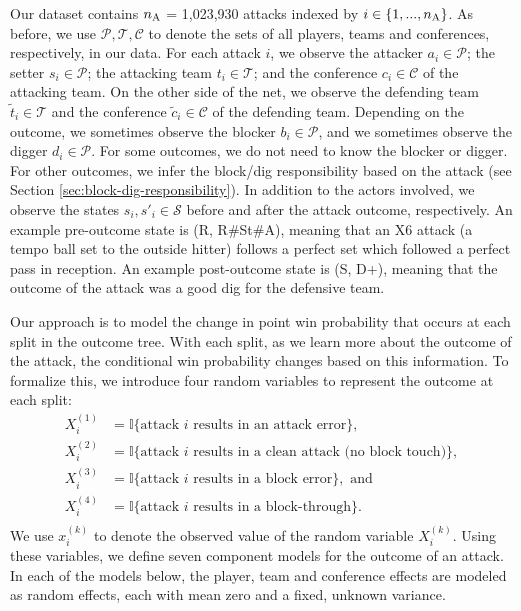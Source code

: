 \documentclass[USenglish]{article}
\theoremstyle{dgthm}
\theoremstyle{dgdef}
\begin{document}
Our dataset contains $n_{\mbox{\scriptsize A}}$ = 1,023,930 attacks indexed by $i \in \{1, ..., n_{\mbox{\scriptsize A}}\}$. As before, we use $\mathcal{P}, \mathcal{T}, \mathcal{C}$ to denote the sets of all players, teams and conferences, respectively, in our data. For each attack $i$, we observe the attacker $a_i \in \mathcal{P}$; the setter $s_i \in \mathcal{P}$; the attacking team $t_i \in \mathcal{T}$; and the conference $c_i \in \mathcal{C}$ of the attacking team. On the other side of the net, we observe the defending team $\tilde t_i \in \mathcal{T}$ and the conference $\tilde c_i \in \mathcal C$ of the defending team. Depending on the outcome, we sometimes observe the blocker $b_i \in \mathcal{P}$, and we sometimes observe the digger $d_i \in \mathcal{P}$. For some outcomes, we do not need to know the blocker or digger. For other outcomes, we infer the block/dig responsibility based on the attack (see Section \ref{sec:block-dig-responsibility}). In addition to the actors involved, we observe the states $s_i, s'_i \in \mathcal{S}$ before and after the attack outcome, respectively. An example pre-outcome state is (R, R\#St\#A), meaning that an X6 attack (a tempo ball set to the outside hitter) follows a perfect set which followed a perfect pass in reception. An example post-outcome state is (S, D+), meaning that the outcome of the attack was a good dig for the defensive team.

Our approach is to model the change in point win probability that occurs at each split in the outcome tree. With each split, as we learn more about the outcome of the attack, the conditional win probability changes based on this information. To formalize this, we introduce four random variables to represent the outcome at each split:
\begin{align*}
    X_i^{(1)} &= \mathbb{I}\{\mbox{attack $i$ results in an attack error}\},\\
    X_i^{(2)} &= \mathbb{I}\{\mbox{attack $i$ results in a clean attack (no block touch)}\},\\
    X_i^{(3)} &= \mathbb{I}\{\mbox{attack $i$ results in a block error}\},\mbox{ and}\\
    X_i^{(4)} &= \mathbb{I}\{\mbox{attack $i$ results in a block-through}\}.\\
\end{align*}
We use $x_i^{(k)}$ to denote the observed value of the random variable $X_i^{(k)}$. Using these variables, we define seven component models for the outcome of an attack. In each of the models below, the player, team and conference effects are modeled as random effects, each with mean zero and a fixed, unknown variance.\\
\end{document}
